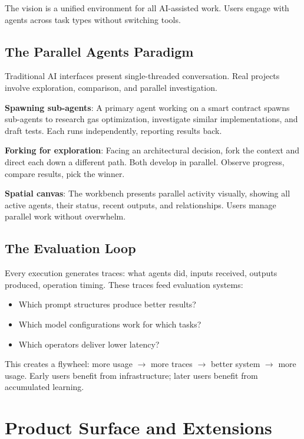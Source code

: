 \documentclass[11pt,a4paper]{article}
\begin{document}
The vision is a unified environment for all AI-assisted work. Users engage with agents across task types without switching tools.

\subsection{The Parallel Agents Paradigm}

Traditional AI interfaces present single-threaded conversation. Real projects involve exploration, comparison, and parallel investigation.

\textbf{Spawning sub-agents}: A primary agent working on a smart contract spawns sub-agents to research gas optimization, investigate similar implementations, and draft tests. Each runs independently, reporting results back.

\textbf{Forking for exploration}: Facing an architectural decision, fork the context and direct each down a different path. Both develop in parallel. Observe progress, compare results, pick the winner.

\textbf{Spatial canvas}: The workbench presents parallel activity visually, showing all active agents, their status, recent outputs, and relationships. Users manage parallel work without overwhelm.

\subsection{The Evaluation Loop}

Every execution generates traces: what agents did, inputs received, outputs produced, operation timing. These traces feed evaluation systems:

\begin{itemize}[noitemsep]
    \item Which prompt structures produce better results?
    \item Which model configurations work for which tasks?
    \item Which operators deliver lower latency?
\end{itemize}

This creates a flywheel: more usage $\rightarrow$ more traces $\rightarrow$ better system $\rightarrow$ more usage. Early users benefit from infrastructure; later users benefit from accumulated learning.

\section{Product Surface and Extensions}
\end{document}
